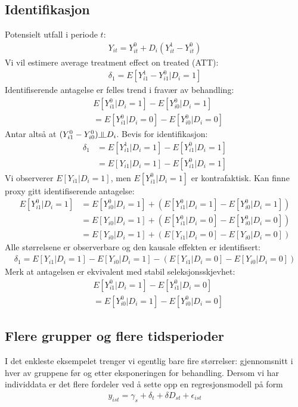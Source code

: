 \subsection{Identifikasjon}
Potensielt utfall i periode $t$:
\begin{align}
Y_{it}=Y_{it}^0+D_i(Y_{it}^1-Y_{it}^0)
\end{align}
Vi vil estimere average treatment effect on treated (ATT):
\begin{align}
\delta_1 = E[Y_{i1}^1-Y_{i1}^0|D_i=1]
\end{align}
Identifiserende antagelse er felles trend i fravær av behandling:
\begin{align}
&E[Y_{i1}^0|D_i=1]-E[Y_{i0}^0|D_i=1] \\
&=E[Y_{i1}^0|D_i=0]-E[Y_{i0}^0|D_i=0]
\end{align}
Antar altså at $(Y_{i1}^0-Y_{i0}^0) \indep D_i$. Bevis for identifikasjon:
\begin{align}
\delta_1 &= E[Y_{i1}^1|D_i=1]-E[Y_{i1}^0|D_i=1] \\
&= E[Y_{i1}|D_i=1] -E[Y_{i1}^0|D_i=1]
\end{align}
Vi observerer $E[Y_{i1}|D_i=1]$, men $E[Y_{i1}^0|D_i=1]$ er kontrafaktisk. Kan finne proxy gitt identifiserende antagelse:
\begin{align}
E[Y_{i1}^0|D_i=1] &= E[Y_{i0}^0|D_i=1] + (E[Y_{i1}^0|D_i=1] - E[Y_{i0}^0|D_i=1]) \\
&=   E[Y_{i0}|D_i=1] + (E[Y_{i1}^0|D_i=0] - E[Y_{i0}^0|D_i=0]) \\
&=   E[Y_{i0}|D_i=1] + (E[Y_{i1}|D_i=0] - E[Y_{i0}|D_i=0])
\end{align}
Alle størrelsene er observerbare og den kausale effekten er identifisert:
\begin{align}
\delta_1 = E[Y_{i1}|D_i=1] - E[Y_{i0}|D_i=1] -(E[Y_{i1}|D_i=0] - E[Y_{i0}|D_i=0])
\end{align}
Merk at antagelsen er ekvivalent med stabil seleksjonsskjevhet:
\begin{align}
&E[Y_{i1}^0|D_i=1] - E[Y_{i1}^0|D_i=0] \\
&=E[Y_{i0}^0|D_i=1] - E[Y_{i0}^0|D_i=0]
\end{align}
\subsection{Flere grupper og flere tidsperioder}
I det enkleste eksempelet trenger vi egentlig bare fire størrelser: gjennomsnitt i hver av gruppene før og etter eksponeringen for behandling. Dersom vi har individdata er det flere fordeler ved å sette opp en regresjonsmodell på form
\begin{align}
y_{ist} = \gamma_s + \delta_t+\delta D_{st}+\epsilon_{ist}
\end{align}
